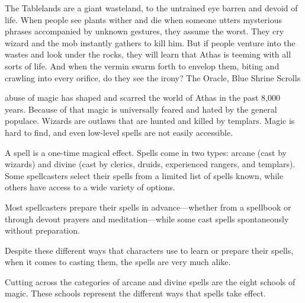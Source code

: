 {The Tablelands are a giant wasteland, to the untrained eye barren and devoid of life. When people see plants wither and die when someone utters mysterious phrases accompanied by unknown gestures, they assume the worst. They cry wizard and the mob instantly gathers to kill him. But if people venture into the wastes and look under the rocks, they will learn that Athas is teeming with all sorts of life. And when the vermin swarm forth to envelop them, biting and crawling into every orifice, do they see the irony?}
{The Oracle, Blue Shrine Scrolls}

 abuse of magic has shaped and scarred the world of Athas in the past 8,000 years. Because of that magic is universally feared and hated by the general populace. Wizards are outlaws that are hunted and killed by templars. Magic is hard to find, and even low-level spells are not easily accessible.

A spell is a one-time magical effect. Spells come in two types: arcane (cast by wizards) and divine (cast by clerics, druids, experienced rangers, and templars). Some spellcasters select their spells from a limited list of spells known, while others have access to a wide variety of options.

Most spellcasters prepare their spells in advance---whether from a spellbook or through devout prayers and meditation---while some cast spells spontaneously without preparation.

Despite these different ways that characters use to learn or prepare their spells, when it comes to casting them, the spells are very much alike.

Cutting across the categories of arcane and divine spells are the eight schools of magic. These schools represent the different ways that spells take effect.








